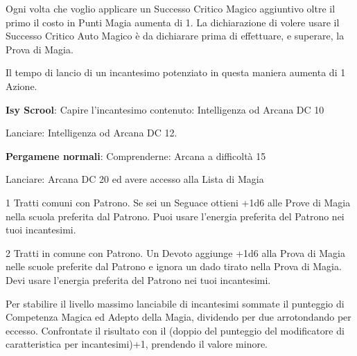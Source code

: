 \documentclass[landscape,10pt,a4paper]{article}
\begin{document}
\begin{multicols}{2}
\begin{dmbox}[title=Successo Critico Auto Magico - pagina \pageref{magienova}]
Ogni volta che voglio applicare un Successo Critico Magico aggiuntivo oltre il primo il costo in Punti Magia aumenta di 1. La dichiarazione di volere usare il Successo Critico Auto Magico è da dichiarare prima di effettuare, e superare, la Prova di Magia.

Il tempo di lancio di un incantesimo potenziato in questa maniera aumenta di 1 Azione.
\end{dmbox}


\begin{dmbox}[title=Leggere una Pergamena - pagina \pageref{leggerepergamena}]

\textbf{Isy Scrool}: Capire l'incantesimo contenuto: Intelligenza od Arcana DC 10

Lanciare: Intelligenza od Arcana DC 12.

\textbf{Pergamene normali}: Comprenderne: Arcana a difficoltà 15

Lanciare: Arcana DC 20 ed avere accesso alla Lista di Magia
\end{dmbox}


\begin{dmbox}[title=Seguace - pagina \pageref{magieregoledibase}]
1 Tratti comuni con Patrono. Se sei un Seguace ottieni +1d6 alle Prove di Magia nella scuola preferita dal Patrono. Puoi usare l'energia preferita del Patrono nei tuoi incantesimi.
\end{dmbox}

\begin{dmbox}[title=Devoto - pagina \pageref{magieregoledibase}]
2 Tratti in comune con Patrono. Un Devoto aggiunge +1d6 alla Prova di Magia nelle scuole preferite dal Patrono e ignora un dado tirato nella Prova di Magia. Devi usare l'energia preferita del Patrono nei tuoi incantesimi.
\end{dmbox}


\begin{dmbox}[title=Massimo Livello Incantesimo lanciabile - pagina \pageref{magieaccessoallelistedimagia}]
Per stabilire il livello massimo lanciabile di incantesimi sommate il punteggio di Competenza Magica ed Adepto della Magia, dividendo per due arrotondando per eccesso. Confrontate il risultato con il (doppio del punteggio del modificatore di caratteristica per incantesimi)+1, prendendo il valore minore.
\end{dmbox}

\begin{dmbox}[title=Fallimento Critico Prova di Magia - pagina \pageref{magiefallimentocriticonellaprovadimagia}]


\end{dmbox}
\end{multicols}
\end{document}
